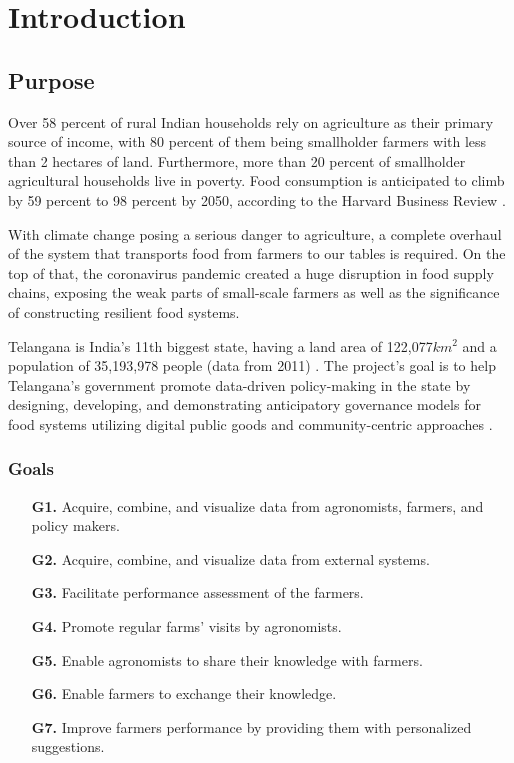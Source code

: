 \chapter{Introduction}

\section{Purpose}



Over 58 percent of rural Indian households rely on agriculture as their primary source of income, with 80 percent of them being smallholder farmers with less than 2 hectares of land. Furthermore, more than 20 percent of smallholder agricultural households live in poverty. Food consumption is anticipated to climb by 59 percent to 98 percent by 2050, according to the Harvard Business Review \cite{global_demand_for_food}.

With climate change posing a serious danger to agriculture, a complete overhaul of the system that transports food from farmers to our tables is required. On the top of that, the coronavirus pandemic created a huge disruption in food supply chains, exposing the weak parts of small-scale farmers as well as the significance of constructing resilient food systems.

Telangana is India's 11th biggest state, having a land area of 122,077$km^2$ and a population of 35,193,978 people (data from 2011) \cite{telangana}. The project's goal is to help Telangana’s government promote data-driven policy-making in the state by designing, developing, and demonstrating anticipatory governance models for food systems utilizing digital public goods and community-centric approaches \cite{reference_doc}.

\subsection{Goals} \label{subsec:goals}
\begin{itemize}
	\item [\textbf{G1.}] Acquire, combine, and visualize data from agronomists, farmers, and policy makers.
	\item [\textbf{G2.}] Acquire, combine, and visualize data from external systems. 
	\item [\textbf{G3.}] Facilitate performance assessment of the farmers.
	\item [\textbf{G4.}] Promote regular farms' visits by agronomists.
	\item [\textbf{G5.}] Enable agronomists to share their knowledge with farmers.
	\item [\textbf{G6.}] Enable farmers to exchange their knowledge.
	\item [\textbf{G7.}] Improve farmers performance by providing them with personalized suggestions.
\end{itemize}

